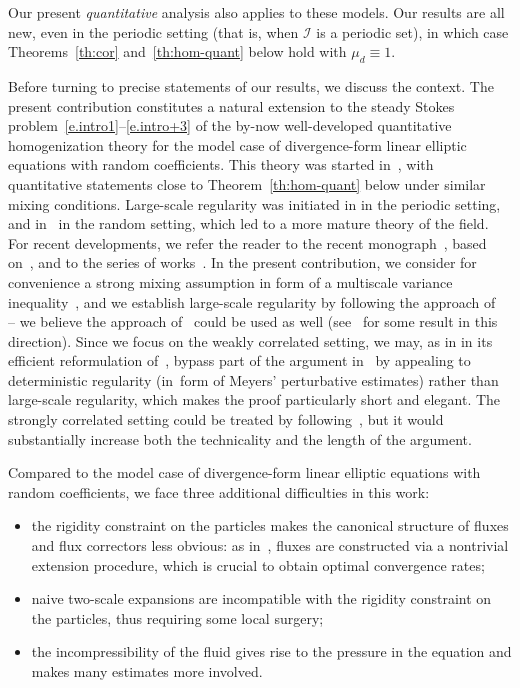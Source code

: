 \documentclass[10pt]{amsart}
\let\mathcal\mathscr
\newcounter{assumption}
\theoremstyle{plain}
\theoremstyle{definition}
\newcommand{\Ic}{\mathcal I}
\begin{document}
Our present \emph{quantitative} analysis also applies to these models.
Our results are all new, even in the periodic setting (that is, when $\Ic$ is a periodic set), in which case Theorems~\ref{th:cor} and~\ref{th:hom-quant} below hold with $\mu_d\equiv 1$.

Before turning to precise statements of our results, we discuss the context.
The present contribution constitutes a natural extension
to the steady Stokes problem~\eqref{e.intro1}--\eqref{e.intro+3}
of the by-now well-developed quantitative homogenization
theory for the model case of divergence-form linear elliptic equations with random coefficients. This theory was started in~\cite{GO1,GO2,GNO1,GNO2,Gloria-Otto-10b,MaO}, with quantitative statements close to Theorem~\ref{th:hom-quant} below under
similar mixing conditions. Large-scale regularity was initiated in \cite{Avellaneda-Lin-87,Avellaneda-Lin-91} in the periodic setting, and in~\cite{AS} in the random setting, which led to a more mature theory of the field.
For recent developments, we refer the reader to the recent monograph~\cite{AKM-book}, based on~\cite{AM-16,AKM1,AKM2}, and to the series of works~\cite{GNO-reg,GNO-quant,GO4,DO1,JO}.
In the present contribution,
we consider for convenience a strong mixing assumption in form of a multiscale variance inequality~\cite{DG1,DG2},
and we establish large-scale regularity by following the approach of~\cite{GNO-reg,GNO-quant,DO1} -- we believe the approach of~\cite{AKM-book} could be used as well (see~\cite[App.\,B]{DG-20c} for some result in this direction).
Since we focus on the weakly correlated setting, we may, as in \cite{GO1} in its efficient reformulation of~\cite{JO}, bypass part of the argument in~\cite{GNO-reg,GNO-quant} by appealing to deterministic regularity (in~form of Meyers' perturbative estimates) rather than large-scale regularity, which makes the proof particularly short and elegant.
The strongly correlated setting could be treated by following~\cite{GNO-reg}, but it would substantially increase both the technicality and the length of the argument.

Compared to the model case of divergence-form linear elliptic equations with random coefficients, we face three additional difficulties in this work:
\begin{itemize}
\item
the rigidity constraint on the particles makes the canonical structure of fluxes and flux correctors less obvious: as in~\cite{D-20}, fluxes are constructed via a nontrivial extension procedure, which is crucial to obtain optimal convergence rates;
\item
naive two-scale expansions are incompatible with the rigidity constraint on the particles, thus requiring some local surgery;
\item
the incompressibility of the fluid gives rise to the pressure in the equation and makes many estimates more involved.
\end{itemize}
\end{document}
